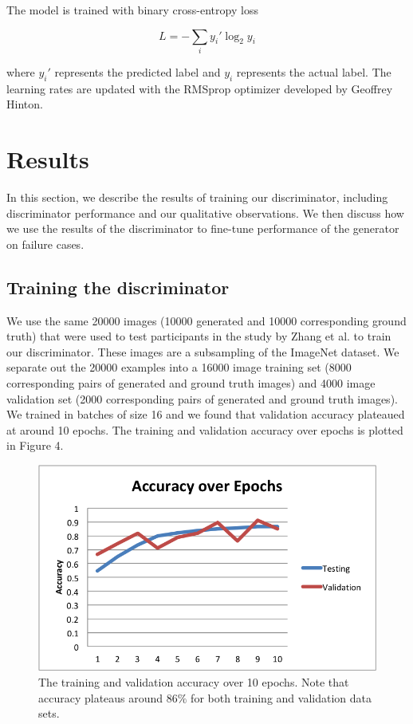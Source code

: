 \documentclass[10pt,twocolumn,letterpaper]{article}
\begin{document}
The model is trained with binary cross-entropy loss 

$$L = - \sum_i y_i' \log_2{y_i}$$

where $y_i'$ represents the predicted label and $y_i$ represents the actual label. The learning rates are updated with the RMSprop optimizer developed by Geoffrey Hinton.

\section{Results}

In this section, we describe the results of training our discriminator, including discriminator performance and our qualitative observations. We then discuss how we use the results of the discriminator to fine-tune performance of the generator on failure cases. 

\subsection{Training the discriminator}

We use the same 20000 images (10000 generated and 10000 corresponding ground truth) that were used to test participants in the study by Zhang et al. to train our discriminator. These images are a subsampling of the ImageNet dataset. We separate out the 20000 examples into a 16000 image training set (8000 corresponding pairs of generated and ground truth images) and 4000 image validation set (2000 corresponding pairs of generated and ground truth images). We trained in batches of size 16 and we found that validation accuracy plateaued at around 10 epochs. The training and validation accuracy over epochs is plotted in Figure 4. 

\begin{figure}[htp]

\centering
\includegraphics[width= 0.45 \textwidth]{training.png} 
\caption{The training and validation accuracy over 10 epochs. Note that accuracy plateaus around $86\%$ for both training and validation data sets.}

\end{figure}
\end{document}
